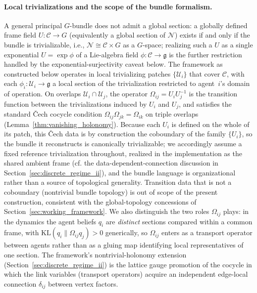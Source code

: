 \documentclass[11pt]{article}
\begin{document}
\paragraph{Local trivializations and the scope of the bundle formalism.}
\label{sec:local_trivialization}
A general principal $G$-bundle does not admit a global section: a globally defined frame field $U: \mathcal{C} \to G$ (equivalently a global section of $\mathcal{N}$) exists if and only if the bundle is trivializable, i.e., $\mathcal{N} \cong \mathcal{C} \times G$ as a $G$-space; realizing such a $U$ as a single exponential $U = \exp\phi$ of a Lie-algebra field $\phi: \mathcal{C} \to \mathfrak{g}$ is the further restriction handled by the exponential-surjectivity caveat below. The framework as constructed below operates in local trivializing patches $\{\mathcal{U}_i\}$ that cover $\mathcal{C}$, with each $\phi_i: \mathcal{U}_i \to \mathfrak{g}$ a local section of the trivialization restricted to agent~$i$'s domain of operation. On overlaps $\mathcal{U}_i \cap \mathcal{U}_j$, the operator $\Omega_{ij} = U_iU_j^{-1}$ is the transition function between the trivializations induced by $U_i$ and $U_j$, and satisfies the standard \v{C}ech cocycle condition $\Omega_{ij}\Omega_{jk} = \Omega_{ik}$ on triple overlaps (Lemma~\ref{thm:vanishing_holonomy}). Because each $U_i$ is defined on the whole of its patch, this \v{C}ech data is by construction the coboundary of the family $\{U_i\}$, so the bundle it reconstructs is canonically trivializable; we accordingly assume a fixed reference trivialization throughout, realized in the implementation as the shared ambient frame (cf. the data-dependent-connection discussion in Section~\ref{sec:discrete_regime_ii}), and the bundle language is organizational rather than a source of topological generality. Transition data that is not a coboundary (nontrivial bundle topology) is out of scope of the present construction, consistent with the global-topology concessions of Section~\ref{sec:working_framework}. We also distinguish the two roles $\Omega_{ij}$ plays: in the dynamics the agent beliefs $q_i$ are \emph{distinct} sections compared within a common frame, with $\mathrm{KL}(q_i \| \Omega_{ij} q_j) > 0$ generically, so $\Omega_{ij}$ enters as a transport operator between agents rather than as a gluing map identifying local representatives of one section. The framework's nontrivial-holonomy extension (Section~\ref{sec:discrete_regime_ii}) is the lattice gauge promotion of the cocycle in which the link variables (transport operators) acquire an independent edge-local connection $\delta_{ij}$ between vertex factors.
\end{document}
